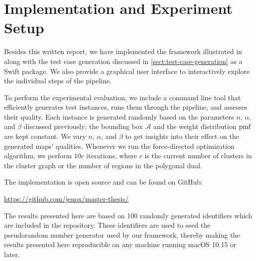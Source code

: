 \section{Implementation and Experiment Setup}
\label{sect:implementation-and-experiment-setup}

Besides this written report, we have implemented the framework illustrated in 
 along with the test case generation discussed in \cref{sect:test-case-generation} as a Swift package.
We also provide a graphical user interface to interactively explore the individual steps of the pipeline.

To perform the experimental evaluation, we include a command line tool that efficiently generates test instances, runs them through the pipeline, and assesses their quality.
Each instance is generated randomly based on the parameters $n$, $\alpha$, and $\beta$ discussed previously; the bounding box $\mathcal{A}$ and the weight distribution $\operatorname{pmf}$ are kept constant.
We vary $n$, $\alpha$, and $\beta$ to get insights into their effect on the generated maps' qualities.
Whenever we run the force-directed optimization algorithm, we perform $10c$ iterations, where $c$ is the current number of clusters in the cluster graph or the number of regions in the polygonal dual.

The implementation is open source and can be found on GitHub:
%
\begin{center}
  \url{https://github.com/jenox/master-thesis/}
\end{center}

The results presented here are based on 100 randomly generated identifiers which are included in the repository.
These identifiers are used to seed the pseudorandom number generator used by our framework, thereby making the results presented here reproducible on any machine running macOS 10.15 or later.
